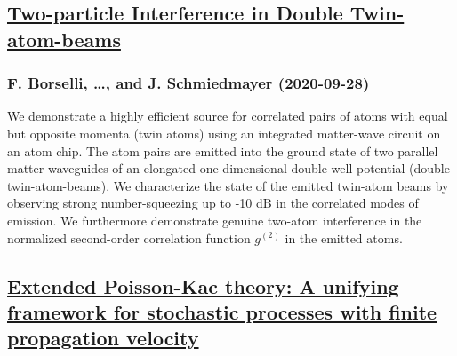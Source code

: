 \subsection*{\href{http://arxiv.org/abs/2009.13438v1}{Two-particle Interference in Double Twin-atom-beams}}
\subsubsection*{F. Borselli, \dots, and J. Schmiedmayer (2020-09-28)}
We demonstrate a highly efficient source for correlated pairs of atoms with
equal but opposite momenta (twin atoms) using an integrated matter-wave circuit
on an atom chip. The atom pairs are emitted into the ground state of two
parallel matter waveguides of an elongated one-dimensional double-well
potential (double twin-atom-beams). We characterize the state of the emitted
twin-atom beams by observing strong number-squeezing up to -10 dB in the
correlated modes of emission. We furthermore demonstrate genuine two-atom
interference in the normalized second-order correlation function $g^{(2)}$ in
the emitted atoms.

\subsection*{\href{http://arxiv.org/abs/2009.13434v1}{Extended Poisson-Kac theory: A unifying framework for stochastic  processes with finite propagation velocity}}
